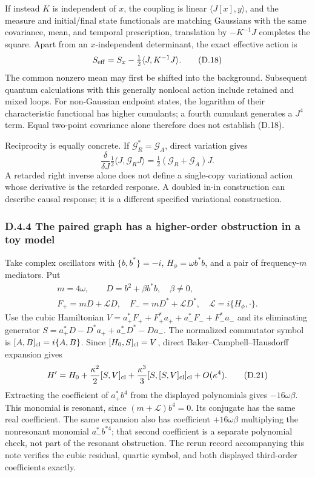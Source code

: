 If instead \(K\) is independent of \(x\), the coupling is linear \(\langle J[x],y\rangle\), and the measure and initial/final state functionals are matching Gaussians with the same covariance, mean, and temporal prescription, translation by \(-K^{-1}J\) completes the square. Apart from an \(x\)-independent determinant, the exact effective action is \[
S_{\rm eff}=S_x-\tfrac12\langle J,K^{-1}J\rangle.
\tag{D.18}
\] The common nonzero mean may first be shifted into the background. Subsequent quantum calculations with this generally nonlocal action include retained and mixed loops. For non-Gaussian endpoint states, the logarithm of their characteristic functional has higher cumulants; a fourth cumulant generates a \(J^4\) term. Equal two-point covariance alone therefore does not establish (D.18).

Reciprocity is equally concrete. If \(\mathcal G_R^*=\mathcal G_A\), direct variation gives \[
\frac{\delta}{\delta J}
\tfrac12\langle J,\mathcal G_RJ\rangle
=\tfrac12(\mathcal G_R+\mathcal G_A)J.
\tag{D.19}
\] A retarded right inverse alone does not define a single-copy variational action whose derivative is the retarded response. A doubled in-in construction can describe causal response; it is a different specified variational construction.

\hypertarget{d.4.4-the-paired-graph-has-a-higher-order-obstruction-in-a-toy-model}{%
\subsubsection{D.4.4 The paired graph has a higher-order obstruction in a toy model}\label{d.4.4-the-paired-graph-has-a-higher-order-obstruction-in-a-toy-model}}

Take complex oscillators with \(\{b,b^*\}=-i\), \(H_\phi=\omega b^*b\), and a pair of frequency-\(m\) mediators. Put \[
\begin{gathered}
m=4\omega,\qquad D=b^2+\beta b^*b,\quad \beta\ne0,\\
F_+=mD+\mathscr LD,\quad F_-=mD^*+\mathscr LD^*,
\quad \mathscr L=i\{H_\phi,\cdot\}.
\end{gathered}
\tag{D.20}
\] Use the cubic Hamiltonian \(V=a_+^*F_++F_+^*a_++a_-^*F_-+F_-^*a_-\) and its eliminating generator \(S=a_+^*D-D^*a_++a_-^*D^*-Da_-\). The normalized commutator symbol is \([A,B]_{\rm cl}=i\{A,B\}\). Since \([H_0,S]_{\rm cl}=V\), direct Baker--Campbell--Hausdorff expansion gives \[
H'=H_0+\frac{\kappa^2}{2}[S,V]_{\rm cl}
+\frac{\kappa^3}{3}[S,[S,V]_{\rm cl}]_{\rm cl}
+O(\kappa^4).
\tag{D.21}
\] Extracting the coefficient of \(a_+^*b^4\) from the displayed polynomials gives \(-16\omega\beta\). This monomial is resonant, since \((m+\mathscr L)b^4=0\). Its conjugate has the same real coefficient. The same expansion also has coefficient \(+16\omega\beta\) multiplying the nonresonant monomial \(a_-^*b^{*4}\); that second coefficient is a separate polynomial check, not part of the resonant obstruction. The rerun record accompanying this note verifies the cubic residual, quartic symbol, and both displayed third-order coefficients exactly.

